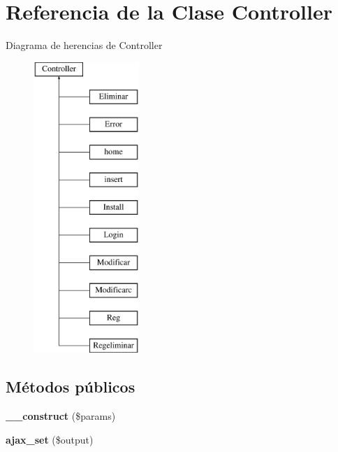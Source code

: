 \hypertarget{class_controller}{}\section{Referencia de la Clase Controller}
\label{class_controller}
Diagrama de herencias de Controller\begin{figure}[H]
\begin{center}
\leavevmode
\includegraphics[height=11.000000cm]{class_controller}
\end{center}
\end{figure}
\subsection*{Métodos públicos}
\begin{DoxyCompactItemize}
\item 
\hypertarget{class_controller_a9162320adff1a1a4afd7f2372f753a3e}{}{\bfseries \+\_\+\+\_\+construct} (\$params)\label{class_controller_a9162320adff1a1a4afd7f2372f753a3e}

\item 
\hypertarget{class_controller_a185653cac2d8a82b6eb5aff50834e49d}{}{\bfseries ajax\+\_\+set} (\$output)\label{class_controller_a185653cac2d8a82b6eb5aff50834e49d}

\end{DoxyCompactItemize}
